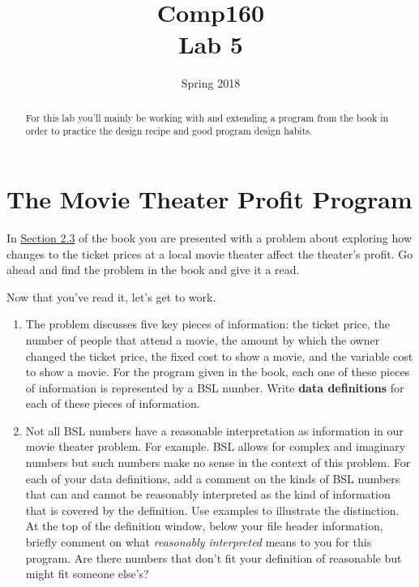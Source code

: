 \documentclass[nobib]{tufte-handout}
\title{Comp160 \\ Lab 5 }
\author{}
\date{ Spring 2018 }
\begin{document}
\maketitle

\begin{abstract}
  For this lab you'll mainly be working with and extending a program from the book in order to practice the design recipe and good program design habits.
\end{abstract}

\section*{The Movie Theater Profit Program}

In \href{http://htdp.org/2018-01-06/Book/part_one.html#%28part._sec~3acomposing%29}{Section 2.3} of the book you are presented with a problem about exploring how changes to the ticket prices at a local movie theater affect the theater's profit. Go ahead and find the problem in the book and give it a read.
\vspace{.25in}

Now that you've read it, let's get to work.
\begin{enumerate}
  \item The problem discusses five key pieces of information: the ticket price, the number of people that attend a movie, the amount by which the owner changed the ticket price, the fixed cost to show a movie, and the variable cost to show a movie. For the program given in the book, each one of these pieces of information is represented by a BSL number. Write \textbf{data definitions} for each of these pieces of information.

  \item Not all BSL numbers have a reasonable interpretation as information in our movie theater problem. For example. BSL allows for complex and imaginary numbers but such numbers make no sense in the context of this problem. For each of your data definitions, add a comment on the kinds of BSL numbers that can and cannot be reasonably interpreted as the kind of information that is covered by the definition. Use examples to illustrate the distinction. At the top of the definition window, below your file header information, briefly comment on what \textit{reasonably interpreted} means to you for this program. Are there numbers that don't fit your definition of reasonable but might fit someone else's?

\end{enumerate}
\end{document}
